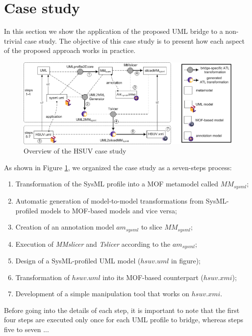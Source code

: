 \section{Case study}\label{sec:caseStudy}
In this section we show the application of the proposed UML bridge to a non-trivial case study.
The objective of this case study is to present how each aspect of the proposed approach works in practice.

\begin{figure}[htbp]
	\centering
		\includegraphics[width=1\textwidth]{figures/caseStudy.png}
	\caption{Overview of the HSUV case study}
	\label{fig:caseStudy}
\end{figure}

As shown in Figure \ref{fig:caseStudy}, we organized the case study as a seven-steps process:
%
\begin{enumerate}
	\item Transformation of the SysML profile into a MOF metamodel called $MM_{sysml}$;
	\item Automatic generation of model-to-model transformations from SysML-profiled models to MOF-based models and vice versa;
	\item Creation of an annotation model $am_{sysml}$ to slice $MM_{sysml}$;
	\item Execution of \textit{MMslicer} and \textit{Tslicer} according to the $am_{sysml}$;
	\item Design of a SysML-profiled UML model ($hsuv.uml$ in figure);
	\item Transformation of $hsuv.uml$ into its MOF-based counterpart ($hsuv.xmi$);
	\item Development of a simple manipulation tool that works on $hsuv.xmi$.
\end{enumerate}
%
Before going into the details of each step, it is important to note that the first four steps are executed only once for each
UML profile to bridge, whereas steps five to seven ...

